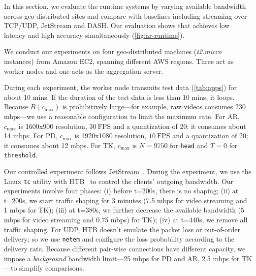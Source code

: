 In this section, we evaluate the runtime systems by varying available bandwidth
across geo-distributed sites and compare \sysname{} with baselines including
streaming over TCP/UDP, JetStream and DASH. Our evaluation shows that \sysname{}
achieves low latency and high accuracy simultaneously
(\autoref{fig:ar-runtime}).


 We conduct our experiments on four geo-distributed
machines (\textit{t2.micro} instances) from Amazon EC2, spanning different AWS
regions. Three act as worker nodes and one acts as the aggregation server.


During each experiment, the worker node transmits test data (\autoref{tab:apps})
for about 10 mins. If the duration of the test data is less than 10 mins, it
loops. Because $B(c_{\max})$ is prohibitively large---for example, raw videos
consumes 230 mbps---we use a reasonable configuration to limit the maximum
rate. For AR, $c_{\max}$ is 1600x900 resolution, \(30~\text{FPS}\) and a
quantization of 20; it consumes about 14 mbps. For PD, $c_{\max}$ is 1920x1080
resolution, \(10~\text{FPS}\) and a quantization of 20; it consumes about 12
mbps. For TK, $c_{\max}$ is $N=9750$ for \texttt{head} and $T=0$ for
\texttt{threshold}.

Our controlled experiment follows JetStream~\cite{rabkin2014aggregation}. During
the experiment, we use the Linux \texttt{tc} utility with HTB~\cite{htb, lartc}
to control the clients' outgoing bandwidth. Our experiments involve four phases:
(i) before t=200s, there is no shaping; (ii) at t=200s, we start traffic shaping
for 3 minutes (7.5 mbps for video streaming and 1 mbps for TK); (iii) at t=380s,
we further decrease the available bandwidth (5 mbps for video streaming and 0.75
mbps) for TK); (iv) at t=440s, we remove all traffic shaping. For UDP, HTB
doesn't emulate the packet loss or out-of-order delivery; so we use
\texttt{netem} and configure the loss probability according to the delivery
rate. Because different pair-wise connections have different capacity, we impose
a \textit{background} bandwidth limit---25 mbps for PD and AR, 2.5 mbps for
TK---to simplify comparisons.

